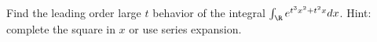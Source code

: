 Find the leading order large $t$ behavior of the integral
$\int_{\R}e^{t^3 x^2 +t^2 x}dx$. Hint: complete the square in $x$ or
use series expansion.
